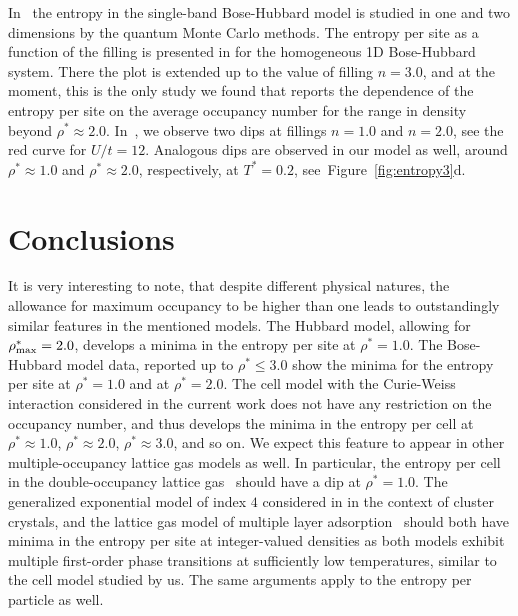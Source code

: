 \documentclass[entropy,article,submit,pdftex,moreauthors]{Definitions/mdpi}
\begin{document}
In~\citep{PKvHT08} the entropy in the single-band Bose-Hubbard model is studied in one and two dimensions by the quantum Monte Carlo methods. The entropy per site as a function of the filling is presented in \citep[Fig.~2]{PKvHT08} for the homogeneous 1D Bose-Hubbard system. There the plot is extended up to the value of filling $n = 3.0$, and at the moment, this is the only study we found that reports the dependence of the entropy per site on the average occupancy number for the range in density beyond $\rho^* \approx 2.0$. In~\citep[Fig.~2]{PKvHT08}, we observe two dips at fillings $n = 1.0$ and $n = 2.0$, see the red curve for $U/t = 12$. Analogous dips are observed in our model as well, around $\rho^* \approx 1.0$ and $\rho^* \approx 2.0$, respectively, at $T^*=0.2$, see~Figure~\ref{fig:entropy3}d.


\section{Conclusions}

It is very interesting to note, that despite different physical natures, the allowance for maximum occupancy to be higher than one leads to outstandingly similar features in the mentioned models. The Hubbard model, allowing for $\rho^*_{\rm max} = 2.0$, develops a minima in the entropy per site at $\rho^* = 1.0$. The Bose-Hubbard model data, reported up to $\rho^* \leq 3.0$ show the minima for the entropy per site at $\rho^*=1.0$ and at $\rho^* = 2.0$. The cell model with the Curie-Weiss interaction considered in the current work does not have any restriction on the occupancy number, and thus develops the minima in the entropy per cell at $\rho^* \approx 1.0$, $\rho^* \approx 2.0$, $\rho^* \approx 3.0$, and so on. We expect this feature to appear in other multiple-occupancy lattice gas models as well. In particular, the entropy per cell in the double-occupancy lattice gas~\citep{LYZ21} should have a dip at $\rho^* = 1.0$. The generalized exponential model of index $4$ considered in \citep{Prestipino14,PGT15} in the context of cluster crystals, and the lattice gas model of multiple layer adsorption~\citep{dOG78} should both have minima in the entropy per site at integer-valued densities as both models exhibit multiple first-order phase transitions at sufficiently low temperatures, similar to the cell model studied by us. The same arguments apply to the entropy per particle as well.

\vspace{6pt} 
\end{document}
